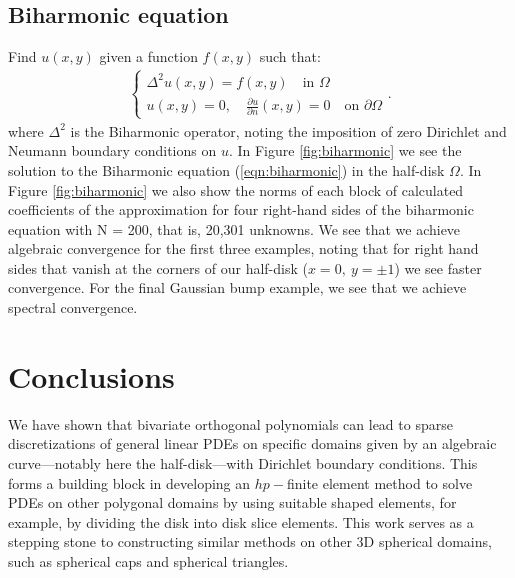 \documentclass[11pt, oneside]{article}   	%
\begin{document}
\subsection{Biharmonic equation}

Find \(u(x,y)\) given a function \(f(x,y)\) such that:
\begin{align}
	\begin{cases}
    		\Delta^2 u(x,y) = f(x,y) \quad \text{in } \Omega \\
		u(x,y) = 0, \quad \frac{\partial u}{\partial n}(x,y) = 0 \quad \text{on } \partial \Omega
	\end{cases}.
	\label{eqn:biharmonic}
\end{align}
where $\Delta^2$ is the Biharmonic operator, noting the imposition of zero Dirichlet and Neumann boundary conditions on $u$. In Figure \ref{fig:biharmonic} we see the solution to the Biharmonic equation (\ref{eqn:biharmonic}) in the half-disk $\Omega$. In Figure \ref{fig:biharmonic} we also show the norms of each block of calculated coefficients of the approximation for four right-hand sides of the biharmonic equation with N = 200, that is, 20,301 unknowns.  We see that we achieve algebraic convergence for the first three examples, noting that for right hand sides that vanish at the corners of our half-disk ($x=0, \: y = \pm 1$) we see faster convergence. For the final Gaussian bump example, we see that we achieve spectral convergence.


%
\section{Conclusions}

We have shown that bivariate orthogonal polynomials can lead to sparse discretizations of general linear PDEs on specific domains given by an algebraic curve---notably here the half-disk---with Dirichlet boundary conditions. This forms a building block in developing an $hp-$finite element method to solve PDEs on other polygonal domains by using suitable shaped elements, for example, by dividing the disk into disk slice elements. 
This work serves as a stepping stone to constructing similar methods on other 3D spherical domains, such as spherical caps and spherical triangles.
\end{document}
